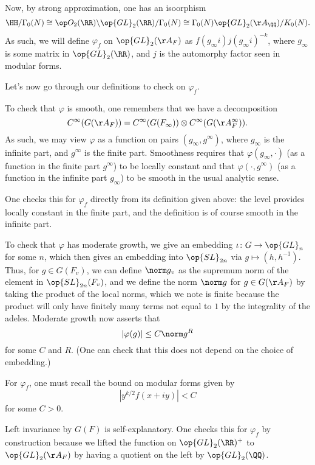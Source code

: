 \documentclass{article}
\begin{document}
Now, by strong approximation, one has an isoorphism
\[\HH/\Gamma_0(N)\cong\op O_2(\RR)\backslash\op{GL}_2(\RR)/\Gamma_0(N)\cong\Gamma_0(N)\op{GL}_2(\AA_\QQ)/K_0(N).\]
As such, we will define $\varphi_f$ on $\op{GL}_2(\AA_F)$ as $f(g_\infty i)j(g_\infty i)^{-k}$, where $g_\infty$ is some matrix in $\op{GL}_2(\RR)$, and $j$ is the automorphy factor seen in modular forms.

Let's now go through our definitions to check on $\varphi_f$.
\begin{listalph}
	\item To check that $\varphi$ is smooth, one remembers that we have a decomposition
	\[C^\infty(G(\AA_F))=C^\infty(G(F_\infty))\otimes C^\infty(G(\AA_F^\infty)).\]
	As such, we may view $\varphi$ as a function on pairs $(g_\infty,g^\infty)$, where $g_\infty$ is the infinite part, and $g^\infty$ is the finite part. Smoothness requires that $\varphi(g_\infty,\cdot)$ (as a function in the finite part $g^\infty$) to be locally constant and that $\varphi(\cdot,g^\infty)$ (as a function in the infinite part $g_\infty$) to be smooth in the usual analytic sense.

	One checks this for $\varphi_f$ directly from its definition given above: the level provides locally constant in the finite part, and the definition is of course smooth in the infinite part.

	\item To check that $\varphi$ has moderate growth, we give an embedding $\iota\colon G\to\op{GL}_n$ for some $n$, which then gives an embedding into $\op{SL}_{2n}$ via $g\mapsto\left(h,h^{-1}\right)$. Thus, for $g\in G(F_v)$, we can define $\norm g_v$ as the supremum norm of the element in $\op{SL}_{2n}(F_v)$, and we define the norm $\norm g$ for $g\in G(\AA_F)$ by taking the product of the local norms, which we note is finite because the product will only have finitely many terms not equal to $1$ by the integrality of the adeles. Moderate growth now asserts that
	\[\left|\varphi(g)\right|\le C\norm g^R\]
	for some $C$ and $R$. (One can check that this does not depend on the choice of embedding.)

	For $\varphi_f$, one must recall the bound on modular forms given by
	\[\left|y^{k/2}f(x+iy)\right|<C\]
	for some $C>0$.

	\item Left invariance by $G(F)$ is self-explanatory. One checks this for $\varphi_f$ by construction because we lifted the function on $\op{GL}_2(\RR)^+$ to $\op{GL}_2(\AA_F)$ by having a quotient on the left by $\op{GL}_2(\QQ)$.


\end{listalph}
\end{document}
